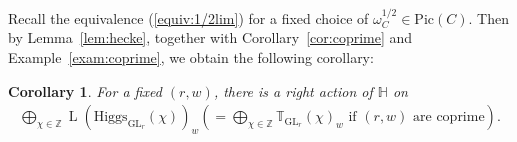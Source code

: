 \documentclass [11pt,oneside,a4paper,mathscr]{amsart}
\newtheorem{cor}[thm]{Corollary}
\theoremstyle{definition}
\newcommand{\LL}{\operatorname{L}}
\newcommand{\Ind}{\operatorname{Ind}}
\newcommand{\IndL}{\operatorname{IndL}}
\newcommand{\GL}{\operatorname{GL}}
\newcommand{\Hig}{\mathrm{Higgs}}
\begin{document}
    

Recall the equivalence (\ref{equiv:1/2lim}) for a fixed choice of $\omega_C^{1/2}\in \mathrm{Pic}(C)$. Then by Lemma~\ref{lem:hecke}, together with Corollary~\ref{cor:coprime} and Example~\ref{exam:coprime}, we obtain the following corollary: 
\begin{cor}\label{cor:1}
For a fixed $(r, w)$, there is a right action of $\mathbb{H}$ on 
\begin{align*}
\bigoplus_{\chi \in \mathbb{Z}}\LL(\Hig_{\GL_r}(\chi))_w \left(=  \bigoplus_{\chi \in \mathbb{Z}}\mathbb{T}_{\mathrm{GL}_r}(\chi)_w \mbox{ if }(r, w) \mbox{ are coprime}\right).
\end{align*}
    \end{cor}

 
\end{document}
